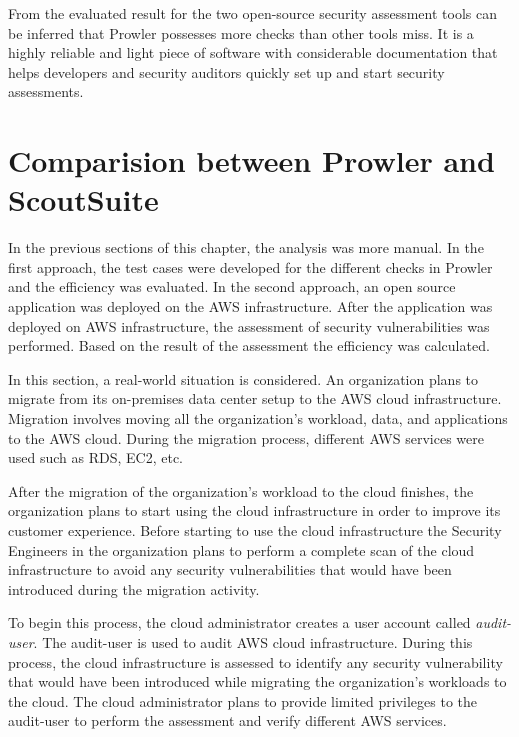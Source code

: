 \par From the evaluated result for the two open-source security assessment tools can be inferred that Prowler possesses more checks than other tools miss.
It is a highly reliable and light piece of software with considerable documentation that helps developers and security auditors quickly set up and start security assessments.

\section{Comparision between Prowler and ScoutSuite}

\par In the previous sections of this chapter, the analysis was more manual.
In the first approach, the test cases were developed for the different checks in Prowler and the efficiency was evaluated.
In the second approach, an open source application was
deployed
on the AWS infrastructure.
After the application
was deployed on AWS infrastructure, the assessment of
security vulnerabilities was performed.
Based on the result of the assessment the efficiency was calculated.
\\
\par In this section, a real-world situation is considered.
An organization plans to migrate from its on-premises data center setup to the AWS cloud infrastructure.
Migration involves moving all the organization’s workload, data, and applications to the AWS cloud.
During the migration process, different AWS services were
used such as RDS, EC2, etc.
\\
\par After the migration of the organization’s workload to the cloud finishes, the organization plans to start using the cloud infrastructure in order to improve its customer experience.
Before starting to use the cloud infrastructure the
Security Engineers in the organization plans to perform a complete scan of the cloud infrastructure to avoid any security vulnerabilities that would have been introduced during the migration activity.
\\
\par To begin this process, the cloud administrator creates a user account called \textit{audit-user}.
The audit-user is used to audit AWS cloud infrastructure.
During this process, the cloud infrastructure is assessed to identify any security vulnerability that would have been introduced while migrating the organization’s workloads to the cloud.
The cloud administrator plans to provide limited privileges to the audit-user to perform the assessment and verify different AWS services.
